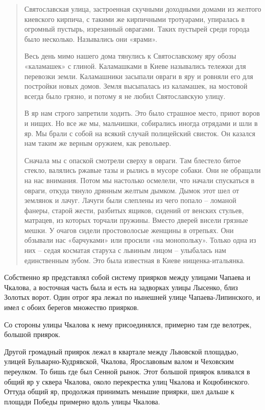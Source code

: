 \begin{quotation}
Святославская улица, застроенная скучными доходными домами из желтого киевского кирпича, с такими же кирпичными тротуарами, упиралась в огромный пустырь, изрезанный оврагами. Таких пустырей среди города было несколько. Назывались они «ярами».

Весь день мимо нашего дома тянулись к Святославскому яру обозы «каламашек» с глиной. Каламашками в Киеве назывались тележки для перевозки земли. Каламашники засыпали овраги в яру и ровняли его для постройки новых домов. Земля высыпалась из каламашек, на мостовой всегда было грязно, и потому я не любил Святославскую улицу.

В яр нам строго запретили ходить. Это было страшное место, приют воров и нищих. Но все же мы, мальчишки, собирались иногда отрядами и шли в яр. Мы брали с собой на всякий случай полицейский свисток. Он казался нам таким же верным оружием, как револьвер.

Сначала мы с опаской смотрели сверху в овраги. Там блестело битое стекло, валялись ржавые тазы и рылись в мусоре собаки. Они не обращали на нас внимания. Потом мы настолько осмелели, что начали спускаться в овраги, откуда тянуло дрянным желтым дымком. Дымок этот шел от землянок и лачуг. Лачуги были слеплены из чего попало – ломаной фанеры, старой жести, разбитых ящиков, сидений от венских стульев, матрацев, из которых торчали пружины. Вместо дверей висели грязные мешки. У очагов сидели простоволосые женщины в отрепьях. Они обзывали нас «барчуками» или просили «на монопольку». Только одна из них – седая косматая старуха с львиным лицом – улыбалась нам единственным зубом. Это была известная в Киеве нищенка-итальянка.
\end{quotation}

Собственно яр представлял собой систему приярков между улицами Чапаева и Чкалова, а восточная часть была и есть на задворках улицы Лысенко, близ Золотых ворот. Один отрог яра лежал по нынешней улице Чапаева-Липинского, и имел с обоих берегов множество приярков. 

Со стороны улицы Чкалова к нему присоединялся, примерно там где велотрек, большой приярок. 

Другой громадный приярок лежал в квартале между Львовской площадью, улицей Бульв\-арно-Кудрявской, Чкалова, Ярославовым валом и Чеховским переулком. То бишь где был Сенной рынок. Этот большой приярок вливался в общий яр у сквера Чкалова, около перекрестка улиц Чкалова и Коцюбинского. Оттуда общий яр, продолжая принимать меньшие приярки, шел дальше к площади Победы примерно вдоль улицы Чкалова.

